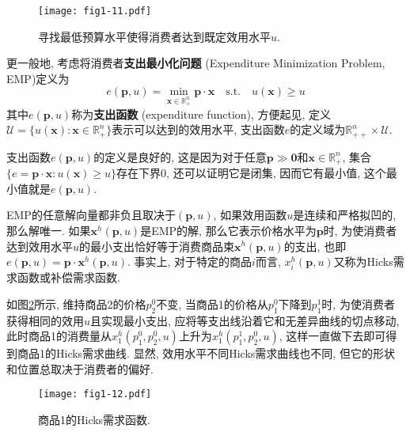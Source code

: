 \documentclass[cn, 12pt, math=mtpro2, bibstyle=apa, blue]{elegantbook}
\newcommand{\R}{\mathbb{R}}
\newcommand{\p}{\mathbf{p}}
\newcommand{\x}{\mathbf{x}}
\begin{document}
\begin{figure}[htbp!]
  \centering
  \texttt{[image: fig1-11.pdf]}
  \caption{寻找最低预算水平使得消费者达到既定效用水平$u$.}\label{fig1.11}
\end{figure}

更一般地, 考虑将消费者\textbf{支出最小化问题} (Expenditure Minimization Problem, EMP)定义为
\begin{equation}\label{eq1.12}
  e(\p,u)=\min_{\x\in\R_+^n} \p\cdot\x\quad\text{s.t.}\quad u(\x)\ge u
\end{equation}
其中$e(\p,u)$称为\textbf{支出函数} (expenditure function), 方便起见, 定义$\mathcal{U}=\{u(\x):\x\in\R_+^n\}$表示可以达到的效用水平, 支出函数$e$的定义域为$\R_{++}^n\times\mathcal{U}$.

支出函数$e(\p,u)$的定义是良好的, 这是因为对于任意$\p\gg\mathbf{0}$和$\x\in\R_+^n$, 集合$\{e=\p\cdot\x: u(\x)\geq u\}$存在下界0, 还可以证明它是闭集, 因而它有最小值, 这个最小值就是$e(\p,u)$.

EMP的任意解向量都非负且取决于$(\p,u)$, 如果效用函数$u$是连续和严格拟凹的, 那么解唯一. 如果$\x^h(\p,u)$是EMP的解, 那么它表示价格水平为$\p$时, 为使消费者达到效用水平$u$的最小支出恰好等于消费商品束$\x^h(\p,u)$的支出, 也即$e(\p,u)=\p\cdot\x^h(\p,u)$. 事实上, 对于特定的商品$i$而言, $x_i^h(\p,u)$又称为Hicks需求函数或补偿需求函数.

如图\ref{fig1.12}所示, 维持商品2的价格$p_2^0$不变, 当商品1的价格从$p_1^0$下降到$p_1^1$时, 为使消费者获得相同的效用$u$且实现最小支出, 应将等支出线沿着它和无差异曲线的切点移动, 此时商品1的消费量从$x_1^h(p_1^0,p_2^0,u)$上升为$x_1^h(p_1^1,p_2^0,u)$, 这样一直做下去即可得到商品1的Hicks需求曲线. 显然, 效用水平不同Hicks需求曲线也不同, 但它的形状和位置总取决于消费者的偏好.
\begin{figure}[htbp!]
  \centering
  \texttt{[image: fig1-12.pdf]}
  \caption{商品1的Hicks需求函数.}\label{fig1.12}
\end{figure}
\end{document}
